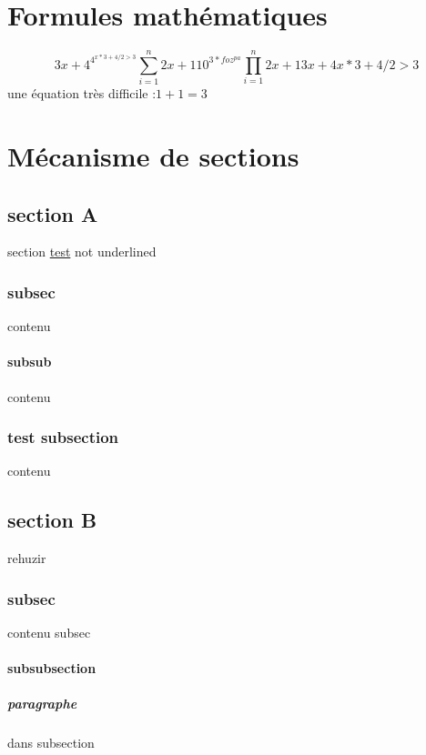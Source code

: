 \documentclass{report}
\begin{document}
\chapter{Formules mathématiques}

\begin{equation}
3x+4^{4^{x*3+4/2 > 3}}
{\sum_{i=1 }^{n} 2x+1} 
10^{3*foz^{pa}}
{\prod_{i=1 }^{n} 2x+1}
3x+4x*3+4/2 > 3
\end{equation}
une équation très difficile :$1+1=3$ 


\chapter{Mécanisme de sections}
\section{section A}{section \underline{\color{red}test}
not underlined \subsection{subsec}{contenu\subsubsection{subsub}{contenu}
} \subsection{test subsection}{contenu}}
\section{section B}{rehuzir\subsection{subsec}{contenu \color{red}subsec\subsubsection{subsubsection}{\paragraph{paragraphe}{dans subsection}}}}
\end{document}
